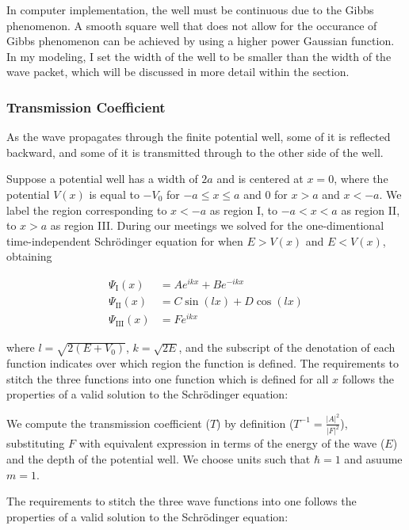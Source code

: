 \documentclass[letterpaper,12pt]{article}
\begin{document}
    In computer implementation, the well must be continuous due to the Gibbs
    phenomenon. A smooth square well that does not allow for the occurance of
    Gibbs
    phenomenon can be achieved by using a higher power Gaussian function. In my
    modeling, I set the width of the well to be smaller than the width of the
    wave packet, which will be discussed in more detail within the
     section.

    \subsubsection*{Transmission Coefficient}
    As the wave propagates through the finite potential well, some of it is
    reflected backward, and some of it is transmitted through to the other side
    of the well.

    Suppose a potential well has a width of $2a$ and is centered at $x = 0$,
    where the potential $V(x)$ is equal to $-V_0$ for $-a \leq x \leq a$ and $0$
    for $x > a$ and $x < -a$. We label the region corresponding to $x < -a$ as
    region I, to $-a < x < a$ as region II, to $x > a$ as region III. During our
    meetings we solved for the one-dimentional time-independent Schrödinger
    equation for when $E > V(x)$ and $E < V(x)$, obtaining

    \begin{align*}
        \Psi_\mathrm{I}(x) &= Ae^{ikx} + Be^{-ikx} \\
        \Psi_{\mathrm{II}}(x) &= C\sin(lx) + D\cos(lx) \\
        \Psi_{\mathrm{III}}(x) &= Fe^{ikx}
    \end{align*}

    where $l = \sqrt{2(E + V_0)}$, $k = \sqrt{2E}$, and the subscript of the
    denotation of each function indicates over which region the function is
    defined. The requirements to stitch the three functions into one function
    which is defined for all $x$
    follows the properties of a valid solution to the Schrödinger equation:

    We compute the transmission coefficient ($T$) by definition ($T^{-1} =
    \frac{\left| A \right| ^{2}}{\left| F \right| ^{2}}$), substituting $F$ with
    equivalent expression in terms of the energy of the wave ($E$) and the
    depth of the potential well. We choose units such that $\hbar = 1$ and
    asuume $m = 1$.

    The requirements to stitch the three wave functions into one follows the
    properties of a valid solution to the Schrödinger equation:
\end{document}
